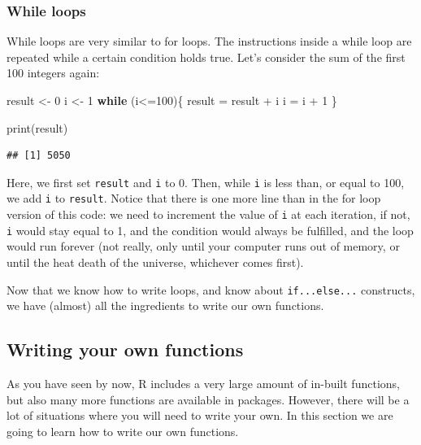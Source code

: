 \documentclass[
]{article}
\newenvironment{Shaded}{\begin{snugshade}}{\end{snugshade}}
\newcommand{\ControlFlowTok}[1]{\textcolor[rgb]{0.13,0.29,0.53}{\textbf{#1}}}
\newcommand{\DecValTok}[1]{\textcolor[rgb]{0.00,0.00,0.81}{#1}}
\newcommand{\FunctionTok}[1]{\textcolor[rgb]{0.00,0.00,0.00}{#1}}
\newcommand{\NormalTok}[1]{#1}
\newcommand{\OtherTok}[1]{\textcolor[rgb]{0.56,0.35,0.01}{#1}}
\newcommand{\SpecialCharTok}[1]{\textcolor[rgb]{0.00,0.00,0.00}{#1}}
\begin{document}
\hypertarget{while-loops}{%
\subsubsection{While loops}\label{while-loops}}

While loops are very similar to for loops. The instructions inside a while loop are repeated while a
certain condition holds true. Let's consider the sum of the first 100 integers again:

\begin{Shaded}
\begin{Highlighting}[]
\NormalTok{result }\OtherTok{\textless{}{-}} \DecValTok{0}
\NormalTok{i }\OtherTok{\textless{}{-}} \DecValTok{1}
\ControlFlowTok{while}\NormalTok{ (i}\SpecialCharTok{\textless{}=}\DecValTok{100}\NormalTok{)\{}
\NormalTok{  result }\OtherTok{=}\NormalTok{ result }\SpecialCharTok{+}\NormalTok{ i}
\NormalTok{  i }\OtherTok{=}\NormalTok{ i }\SpecialCharTok{+} \DecValTok{1}
\NormalTok{\}}

\FunctionTok{print}\NormalTok{(result)}
\end{Highlighting}
\end{Shaded}

\begin{verbatim}
## [1] 5050
\end{verbatim}

Here, we first set \texttt{result} and \texttt{i} to 0. Then, while \texttt{i} is less than, or equal to 100, we add \texttt{i}
to \texttt{result}. Notice that there is one more line than in the for loop version of this code: we need
to increment the value of \texttt{i} at each iteration, if not, \texttt{i} would stay equal to 1, and the
condition would always be fulfilled, and the loop would run forever (not really, only until your
computer runs out of memory, or until the heat death of the universe, whichever comes first).

Now that we know how to write loops, and know about \texttt{if...else...} constructs, we have (almost) all
the ingredients to write our own functions.

\hypertarget{writing-your-own-functions}{%
\subsection{Writing your own functions}\label{writing-your-own-functions}}

As you have seen by now, R includes a very large amount of in-built functions, but also many
more functions are available in packages. However, there will be a lot of situations where you will
need to write your own. In this section we are going to learn how to write our own functions.
\end{document}
